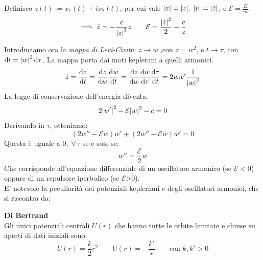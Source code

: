 Definisco $z(t):=x_1(t)+ix_2(t)$, per cui vale $\abs{x}= \abs{z}, \;\abs{v}= \abs{\dot{z}}$, e $\mathcal{E}=\frac{E}{m}$.
\begin{equation}
    \implies \ddot{z}= -\frac{c}{\abs{z}^3}z \qquad \mathcal{E}= \frac{\abs{\dot{z}}^2}{2}-\frac{c}{z}
\end{equation}

Introduciamo ora la \textit{mappa di Levi-Civita}: $z\rightarrow w$ ,con $z = w^2$, e $t\rightarrow \tau$, con $\dd{t}= \abs{w}^2\dd{\tau}$.
La mappa porta dai moti keplerani a quelli armonici.
\begin{equation}
    \dot{z}= \dv{z}{t}= \dv{z}{w}\dv{w}{t}= \dv{z}{w}\dv{w}{\tau}\dv{\tau}{t}= 2 w w' \frac{1}{\abs{w}^2}
\end{equation}
La legge di conservazione dell'energia diventa:
\begin{equation}
    2\abs{w'}^2-\mathcal{E}\abs{w}^2-c=0
\end{equation}
Derivando in $\tau$, otteniamo:
\begin{equation}
    \left( 2w'' - \mathcal{E}w \right)\overline{w}' + \left( 2\overline{w}'' - \mathcal{E}\overline{w} \right)w' = 0
\end{equation}
Questa è uguale a $0, \;\forall\,\tau$ se e solo se:
\begin{equation}
    w''=\frac{\mathcal{E}}{2}w
\end{equation}
Che corrisponde all'equazione differenziale di un oscillatore armonico (se $\mathcal{E}<0$) oppure di un repulsore iperbolico (se $\mathcal{E}$>0).\\
E' notevole la peculiarità dei potenziali kepleriani e degli oscillatori armonici, che si riscontra da:
\begin{theorem}
    \textbf{Di Bertrand}\\
    Gli unici potenziali centrali $U(r)$ che hanno tutte le orbite limitate e chiuse su aperti di dati iniziali sono:
    \begin{equation}
        U(r)= \frac{k}{2}r^2 \qquad U(r)= -\frac{k'}{r} \qquad \text{con } k,k'>0
    \end{equation}
\end{theorem}




